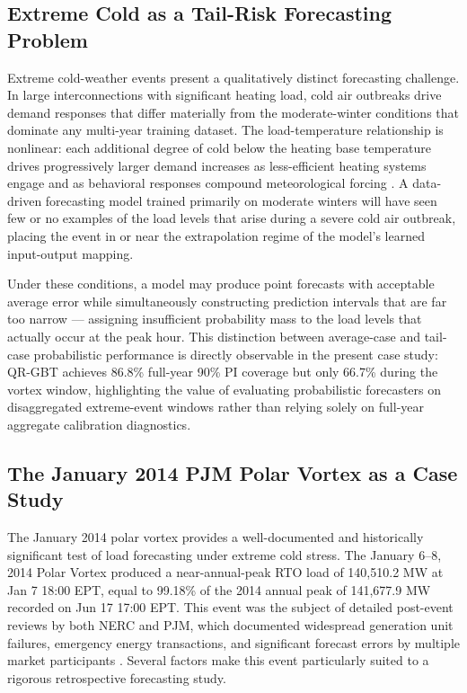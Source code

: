\documentclass[12pt,a4paper]{article}
\begin{document}
\subsection{Extreme Cold as a Tail-Risk Forecasting Problem}
Extreme cold-weather events present a qualitatively distinct forecasting challenge. In large interconnections with significant heating load, cold air outbreaks drive demand responses that differ materially from the moderate-winter conditions that dominate any multi-year training dataset. The load-temperature relationship is nonlinear: each additional degree of cold below the heating base temperature drives progressively larger demand increases as less-efficient heating systems engage and as behavioral responses compound meteorological forcing \cite{fan2012shortterm}. A data-driven forecasting model trained primarily on moderate winters will have seen few or no examples of the load levels that arise during a severe cold air outbreak, placing the event in or near the extrapolation regime of the model's learned input-output mapping. 

Under these conditions, a model may produce point forecasts with acceptable average error while simultaneously constructing prediction intervals that are far too narrow --- assigning insufficient probability mass to the load levels that actually occur at the peak hour. This distinction between average-case and tail-case probabilistic performance is directly observable in the present case study: QR-GBT achieves 86.8\% full-year 90\% PI coverage but only 66.7\% during the vortex window, highlighting the value of evaluating probabilistic forecasters on disaggregated extreme-event windows rather than relying solely on full-year aggregate calibration diagnostics.
\subsection{The January 2014 PJM Polar Vortex as a Case Study}
The January 2014 polar vortex provides a well-documented and historically significant test of load forecasting under extreme cold stress. The January 6–8, 2014 Polar Vortex produced a near-annual-peak RTO load of 140,510.2 MW at Jan 7 18:00 EPT, equal to 99.18\% of the 2014 annual peak of 141,677.9 MW recorded on Jun 17 17:00 EPT. This event was the subject of detailed post-event reviews by both NERC and PJM, which documented widespread generation unit failures, emergency energy transactions, and significant forecast errors by multiple market participants \cite{nerc2014polar,pjm2014polar}. Several factors make this event particularly suited to a rigorous retrospective forecasting study.
\end{document}

